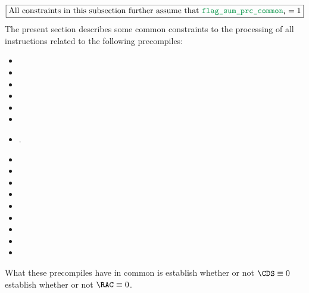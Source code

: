 \[
	\boxed{\text{All constraints in this subsection further assume that }
	\locPrcFlagSumCommon_{i} = 1
	}
\]
The present section describes some common constraints to the processing of all \oobMod{} instructions related to the following precompiles:
\begin{multicols}{2}
	\begin{itemize}
		\item {}
		\item {}
		\item {}
		\item {}
		\item {}
		\item {}
		\item {}.
		\item[\vspace{\fill}]
		\item {}
		\item {}
		\item {}
		\item {}
		\item {}
		\item {}
		\item {}
		\item {}
	\end{itemize}
\end{multicols}
\noindent What these precompiles have in common is
 establish whether or not $\CDS \equiv 0$
 establish whether or not $\RAC \equiv 0$.

